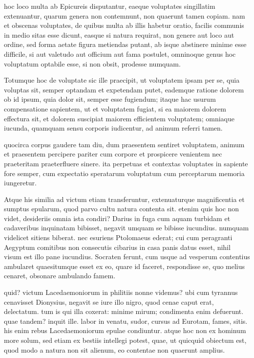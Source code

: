  hoc loco multa ab Epicureis disputantur, eaeque voluptates singillatim extenuantur, quarum genera non contemnunt, non quaerunt tamen copiam. nam et obscenas voluptates, de quibus multa ab illis habetur oratio, facilis communis in medio sitas esse dicunt, easque si natura requirat, non genere aut loco aut ordine, sed forma aetate figura metiendas putant, ab isque abstinere minime esse difficile, si aut valetudo aut officium aut fama postulet, omninoque genus hoc voluptatum optabile esse, si non obsit, prodesse numquam.

 Totumque hoc de voluptate sic ille praecipit, ut voluptatem ipsam per se, quia voluptas sit, semper optandam et expetendam putet, eademque ratione dolorem ob id ipsum, quia dolor sit, semper esse fugiendum; itaque hac usurum compensatione sapientem, ut et voluptatem fugiat, si ea maiorem dolorem effectura sit, et dolorem suscipiat maiorem efficientem voluptatem; omniaque iucunda, quamquam sensu corporis iudicentur, ad animum referri tamen.

 quocirca corpus gaudere tam diu, dum praesentem sentiret voluptatem, animum et praesentem percipere pariter cum corpore et prospicere venientem nec praeteritam praeterfluere sinere. ita perpetuas et contextas voluptates in sapiente fore semper, cum expectatio speratarum voluptatum cum perceptarum memoria iungeretur.

 Atque his similia ad victum etiam transferuntur, extenuaturque magnificentia et sumptus epularum, quod parvo cultu natura contenta sit. etenim quis hoc non videt, desideriis omnia ista condiri? Darius in fuga cum aquam turbidam et cadaveribus inquinatam bibisset, negavit umquam se bibisse iucundius. numquam videlicet sitiens biberat. nec esuriens Ptolomaeus ederat; cui cum peragranti Aegyptum comitibus non consecutis cibarius in casa panis datus esset, nihil visum est illo pane iucundius. Socraten ferunt, cum usque ad vesperum contentius ambularet quaesitumque esset ex eo, quare id faceret, respondisse se, quo melius cenaret, obsonare ambulando famem.

 quid? victum Lacedaemoniorum in philitiis nonne videmus? ubi cum tyrannus cenavisset Dionysius, negavit se iure illo nigro, quod cenae caput erat, delectatum. tum is qui illa coxerat: minime mirum; condimenta enim defuerunt. quae tandem? inquit ille. labor in venatu, sudor, cursus ad Eurotam, fames, sitis. his enim rebus Lacedaemoniorum epulae condiuntur. atque hoc non ex hominum more solum, sed etiam ex bestiis intellegi potest, quae, ut quicquid obiectum est, quod modo a natura non sit alienum, eo contentae non quaerunt amplius.


